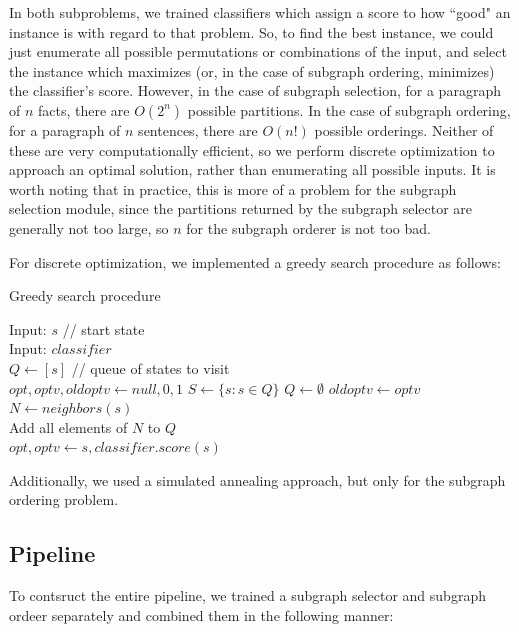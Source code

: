 \documentclass[12pt]{article}
\begin{document}
In both subproblems, we trained classifiers which assign a score to how ``good"
an instance is with regard to that problem. So, to find the best instance, we
could just enumerate all possible permutations or combinations of the input,
and select the instance which maximizes (or, in the case of subgraph ordering,
minimizes) the classifier's score. However, in the case of subgraph selection,
for a paragraph of $n$ facts, there are $O(2^n)$ possible partitions. In the
case of subgraph ordering, for a paragraph of $n$ sentences, there are $O(n!)$
possible orderings. Neither of these are very computationally efficient, so we
perform discrete optimization to approach an optimal solution, rather than
enumerating all possible inputs. It is worth noting that in practice, this is
more of a problem for the subgraph selection module, since the partitions
returned by the subgraph selector are generally not too large, so $n$ for the
subgraph orderer is not too bad.

For discrete optimization, we implemented a greedy search procedure as follows:
\begin{algorithm}
\caption{Greedy search procedure}
\label{greedy_search_alg}
\begin{algorithmic}
\STATE Input: $s$ // start state \\
\STATE Input: $classifier$ \\
\STATE $Q \gets [s]$ // queue of states to visit \\
\STATE $opt, optv, oldoptv \gets null, 0, 1$
    \STATE $S \gets \{s: s \in Q \}$
    \STATE $Q \gets \emptyset$
    \STATE $oldoptv \gets optv$
        \STATE $N \gets neighbors(s)$\\
        \STATE Add all elements of $N$ to $Q$\\
            \STATE $opt, optv \gets s, classifier.score(s)$\\
        \ENDIF
    \ENDFOR
\ENDWHILE
\end{algorithmic}
\end{algorithm}

Additionally, we used a simulated annealing approach, but only for the
subgraph ordering problem.

\subsection{Pipeline}

To contsruct the entire pipeline, we trained a subgraph selector and subgraph
ordeer separately and combined them in the following manner:
\end{document}
